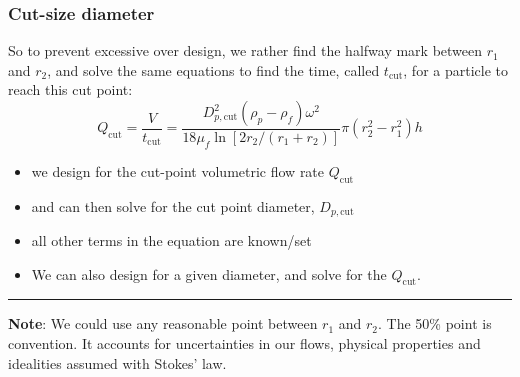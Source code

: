 \begin{frame}\frametitle{Cut-size diameter}
	So to prevent excessive over design, we rather find the halfway mark between $r_1$ and $r_2$, and solve the same equations to find the time, called $t_\text{cut}$, for a particle to reach this {\color{purple}cut point}:
	\[
		Q_\text{cut} = \frac{V}{t_\text{cut}} = \frac{D_{p,\text{cut}}^2\left(\rho_p - \rho_f\right)\omega^2}{18 \mu_f \ln \left[2r_2/(r_1+r_2)\right]} \pi \left(r_2^2 - r_1^2\right) h
	\]
	\begin{itemize}
		\item	we design for the cut-point volumetric flow rate $Q_\text{cut}$
		\item	and can then solve for the cut point diameter, $D_{p,\text{cut}}$
		\item	all other terms in the equation are known/set
		\item	We can also design for a given diameter, and solve for the $Q_\text{cut}$.
	\end{itemize}
	\vspace{6pt}
	\hrule
	\vspace{6pt}
	{\small \textbf{Note}: We could use any reasonable point between $r_1$ and $r_2$. The 50\% point is convention. It accounts for uncertainties in our flows, physical properties and idealities assumed with Stokes' law.}
\end{frame}


